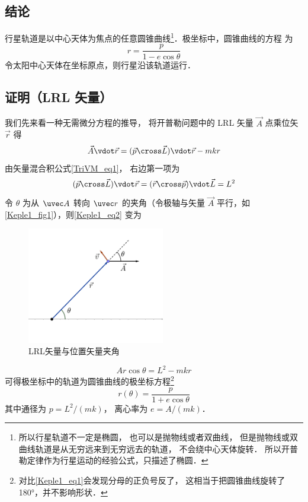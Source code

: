 

\subsection{结论}
行星轨道是以中心天体为焦点的任意圆锥曲线\footnote{所以行星轨道不一定是椭圆， 也可以是抛物线或者双曲线， 但是抛物线或双曲线轨道是从无穷远来到无穷远去的轨道， 不会绕中心天体旋转． 所以开普勒定律作为行星运动的经验公式，只描述了椭圆．}．极坐标中，圆锥曲线的方程
为
\begin{equation}\label{Keple1_eq1}
r = \frac{p}{1 - e \cos \theta }
\end{equation}
令太阳中心天体在坐标原点，则行星沿该轨道运行．

\subsection{证明（LRL 矢量）}

我们先来看一种无需微分方程的推导， 将开普勒问题中的 LRL 矢量 $\vec A$ 点乘位矢 $\vec r$ 得
\begin{equation}\label{Keple1_eq2}
\vec A \vdot \vec r = (\vec p \cross \vec L)\vdot \vec r - mkr
\end{equation}
由矢量混合积公式\autoref{TriVM_eq1}， 右边第一项为
\begin{equation}
(\vec p \cross \vec L)\vdot \vec r = (\vec r \cross \vec p)\vdot \vec L = L^2
\end{equation}
令 $\theta$ 为从 $\uvec A$ 转向 $\uvec r$ 的夹角（令极轴与矢量 $\vec A$ 平行，如\autoref{Keple1_fig1}），则\autoref{Keple1_eq2} 变为
\begin{figure}[ht]
\centering
\includegraphics[width=6cm]{./figures/Keple11.pdf}
\caption{LRL矢量与位置矢量夹角} \label{Keple1_fig1}
\end{figure}
\begin{equation}
Ar\cos\theta = L^2 - mkr
\end{equation}
可得极坐标中的轨道为圆锥曲线的极坐标方程\footnote{对比\autoref{Keple1_eq1}会发现分母的正负号反了， 这相当于把圆锥曲线旋转了 180°，并不影响形状．}
\begin{equation}
r(\theta) = \frac{p}{1 + e\cos\theta}
\end{equation}
其中通径为 $p = L^2/(mk)$， 离心率为 $e = A/(mk)$．

